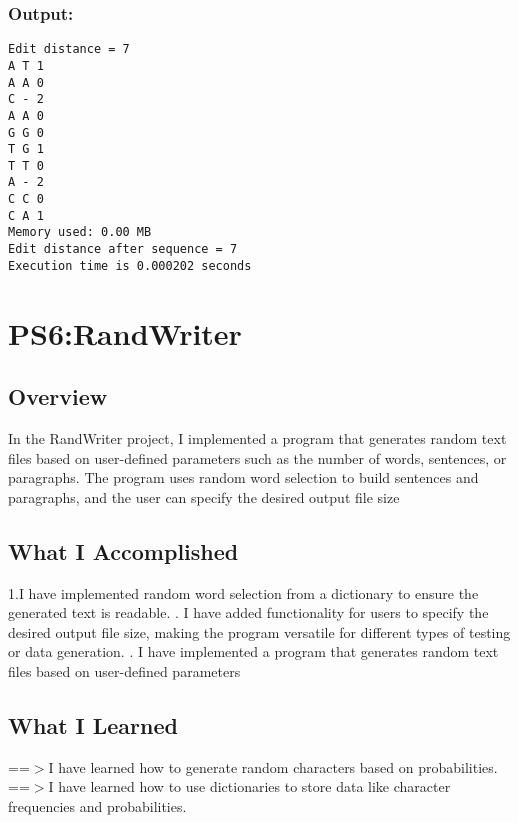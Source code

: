 \documentclass[12pt]{article}
\begin{document}
\subsubsection{Output:}
\begin{lstlisting}[style=cppcode]
Edit distance = 7
A T 1
A A 0
C - 2
A A 0
G G 0
T G 1
T T 0
A - 2
C C 0
C A 1
Memory used: 0.00 MB
Edit distance after sequence = 7
Execution time is 0.000202 seconds
\end{lstlisting}
\newpage
\section{PS6:RandWriter}
\subsection{Overview}
In the RandWriter project, I implemented a program that generates random text files based on user-defined parameters such as the number of words, sentences, or paragraphs. The program uses random word selection to build sentences and paragraphs, and the user can specify the desired output file size
\subsection{What I Accomplished}
1.I have implemented random word selection from a dictionary to ensure the generated text is readable.
. I have added functionality for users to specify the desired output file size, making the program versatile for different types of testing or data generation.
. I have implemented a program that generates random text files based on user-defined parameters
\subsection{What I Learned}
==$>$I have learned how to generate random characters based on probabilities.
\newline
==$>$I have learned how to use dictionaries to store data like character frequencies and probabilities.
\end{document}
